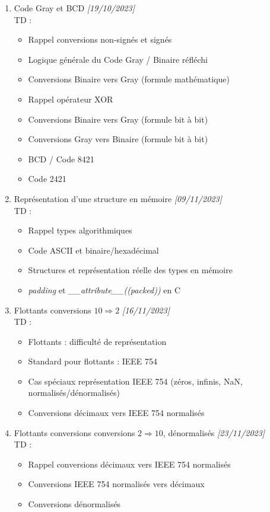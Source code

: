 \documentclass[11pt,a4paper]{article}
\begin{document}
\begin{enumerate}
\medskip

\item Code Gray et BCD \textit{[19/10/2023]}\\
  TD :
  \begin{itemize}
  \item Rappel conversions non-signés et signés
  \item Logique générale du Code Gray / Binaire réfléchi
  \item Conversions Binaire vers Gray (formule mathématique)
  \item Rappel opérateur XOR
  \item Conversions Binaire vers Gray (formule bit à bit)
  \item Conversions Gray vers Binaire (formule bit à bit)
  \item BCD / Code 8421
  \item Code 2421
  \end{itemize}

\clearpage

\item Représentation d'une structure en mémoire \textit{[09/11/2023]}\\
  TD :
  \begin{itemize}
  \item Rappel types algorithmiques
  \item Code ASCII et binaire/hexadécimal
  \item Structures et représentation réelle des types en mémoire
  \item \textit{padding} et \textit{\_\_attribute\_\_((packed))} en C
  \end{itemize}

\medskip

\item Flottants conversions $ 10 \Rightarrow 2 $ \textit{[16/11/2023]}\\
  TD :
  \begin{itemize}
  \item Flottants : difficulté de représentation
  \item Standard pour flottants : IEEE 754
  \item Cas spéciaux représentation IEEE 754 (zéros, infinis, NaN, normalisés/dénormalisés)
  \item Conversions décimaux vers IEEE 754 normalisés
  \end{itemize}

\medskip

\item Flottants conversions conversions $ 2 \Rightarrow 10 $, dénormalisés \textit{[23/11/2023]}\\ %
  TD :
  \begin{itemize}
  \item Rappel conversions décimaux vers IEEE 754 normalisés
  \item Conversions IEEE 754 normalisés vers décimaux
  \item Conversions dénormalisés
  \end{itemize}


\end{enumerate}
\end{document}
